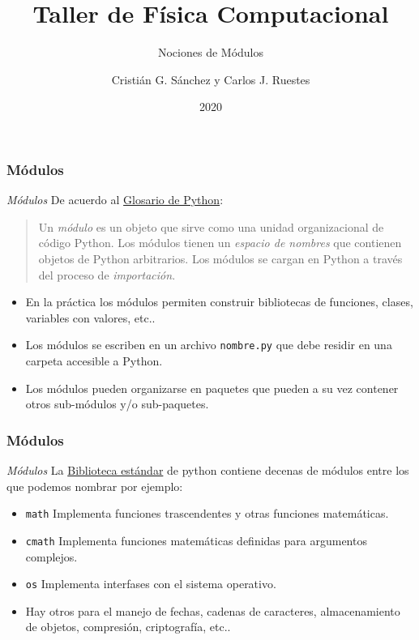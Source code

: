 \documentclass{beamer}
\title{Taller de Física Computacional}
\subtitle{Nociones de Módulos}
\author{Cristián G. Sánchez y Carlos J. Ruestes}
\date{2020}
\begin{document}
\frame{\titlepage}

\begin{frame}[fragile]
\frametitle{Módulos}
\begin{block}{{\em Módulos}}
De acuerdo al \href{https://docs.python.org/3/glossary.html}{Glosario de Python}:
\begin{quote}
Un {\em módulo} es un objeto que sirve como una unidad organizacional de código Python. Los módulos tienen un {\em espacio de nombres} que contienen objetos de Python arbitrarios. Los módulos se cargan en Python a través del proceso de {\em importación}.
\end{quote}
\end{block}
\begin{itemize}
\item En la práctica los módulos permiten construir bibliotecas de funciones, clases, variables con valores, etc..
\item Los módulos se escriben en un archivo {\tt nombre.py} que debe residir en una carpeta accesible a Python.
\item Los módulos pueden organizarse en paquetes que pueden a su vez contener otros sub-módulos y/o sub-paquetes.
\end{itemize}

\end{frame}

\begin{frame}[fragile]
\frametitle{Módulos}
\begin{block}{{\em Módulos}}
La \href{https://docs.python.org/3/library/index.html}{Biblioteca estándar} de python contiene decenas de módulos entre los que podemos nombrar por ejemplo:
\begin{itemize}
\item {\tt math} Implementa funciones trascendentes y otras funciones matemáticas.
\item {\tt cmath} Implementa funciones matemáticas definidas para argumentos complejos.
\item {\tt os} Implementa interfases con el sistema operativo.
\item Hay otros para el manejo de fechas, cadenas de caracteres, almacenamiento de objetos, compresión, criptografía, etc..
\end{itemize}
\end{block}
\end{frame}
\end{document}
